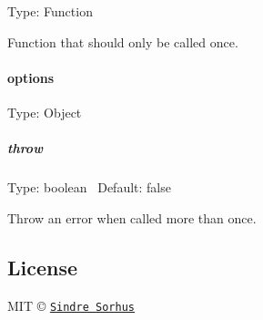 Type\+: {\ttfamily Function}

Function that should only be called once.

\paragraph*{options}

Type\+: {\ttfamily Object}

\subparagraph*{throw}

Type\+: {\ttfamily boolean}~\newline
 Default\+: {\ttfamily false}

Throw an error when called more than once.

\subsection*{License}

M\+IT © \href{https://sindresorhus.com}{\tt Sindre Sorhus} 